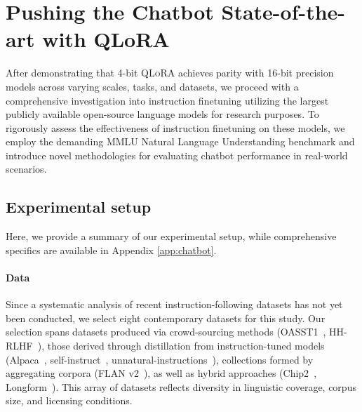 \section{Pushing the Chatbot State-of-the-art with QLoRA}
\label{sec:pushing}
After demonstrating that 4-bit \textsc{QLoRA} achieves parity with 16-bit precision models across varying scales, tasks, and datasets, we proceed with a comprehensive investigation into instruction finetuning utilizing the largest publicly available open-source language models for research purposes. To rigorously assess the effectiveness of instruction finetuning on these models, we employ the demanding MMLU Natural Language Understanding benchmark and introduce novel methodologies for evaluating chatbot performance in real-world scenarios.

\subsection{Experimental setup} Here, we provide a summary of our experimental setup, while comprehensive specifics are available in Appendix \ref{app:chatbot}.

\paragraph{Data} Since a systematic analysis of recent instruction-following datasets has not yet been conducted, we select eight contemporary datasets for this study. Our selection spans datasets produced via crowd-sourcing methods (OASST1~\citep{kopf2023openassistant}, HH-RLHF~\citep{bai2022training}), those derived through distillation from instruction-tuned models (Alpaca~\citep{alpaca}, self-instruct~\citep{wang2022self}, unnatural-instructions~\citep{honovich2022unnatural}), collections formed by aggregating corpora (FLAN v2~\citep{chung2022scaling}), as well as hybrid approaches (Chip2~\citep{laion2023}, Longform~\citep{koksal2023longform}). This array of datasets reflects diversity in linguistic coverage, corpus size, and licensing conditions.

